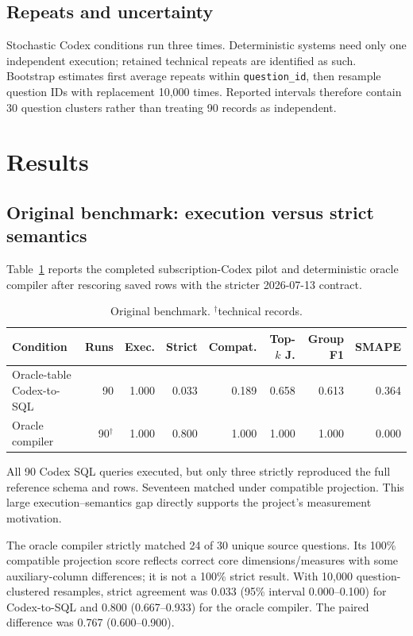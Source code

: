 \documentclass[11pt]{article}
\begin{document}
\subsection{Repeats and uncertainty}
Stochastic Codex conditions run three times. Deterministic systems need only one
independent execution; retained technical repeats are identified as such.
Bootstrap estimates first average repeats within \texttt{question\_id}, then
resample question IDs with replacement 10,000 times. Reported intervals therefore
contain 30 question clusters rather than treating 90 records as independent.

\section{Results}

\subsection{Original benchmark: execution versus strict semantics}
Table~\ref{tab:orig} reports the completed subscription-Codex pilot and
deterministic oracle compiler after rescoring saved rows with the stricter
2026-07-13 contract.

\begin{table}[h]
\centering\small
\setlength{\tabcolsep}{4pt}
\begin{tabular}{lrrrrrrr}
\toprule
Condition & Runs & Exec. & Strict & Compat. & Top-$k$ J. & Group F1 & SMAPE \\
\midrule
Oracle-table Codex-to-SQL & 90 & 1.000 & 0.033 & 0.189 & 0.658 & 0.613 & 0.364 \\
Oracle compiler & 90$^\dagger$ & 1.000 & 0.800 & 1.000 & 1.000 & 1.000 & 0.000 \\
\bottomrule
\end{tabular}
\caption{Original benchmark. $^\dagger$technical records.}
\label{tab:orig}
\end{table}

All 90 Codex SQL queries executed, but only three strictly reproduced the full
reference schema and rows. Seventeen matched under compatible projection. This
large execution--semantics gap directly supports the project's measurement
motivation.

The oracle compiler strictly matched 24 of 30 unique source questions. Its 100\%
compatible projection score reflects correct core dimensions/measures with some
auxiliary-column differences; it is not a 100\% strict result. With 10,000
question-clustered resamples, strict agreement was 0.033 (95\% interval
0.000--0.100) for Codex-to-SQL and 0.800 (0.667--0.933) for the oracle compiler.
The paired difference was 0.767 (0.600--0.900).
\end{document}
